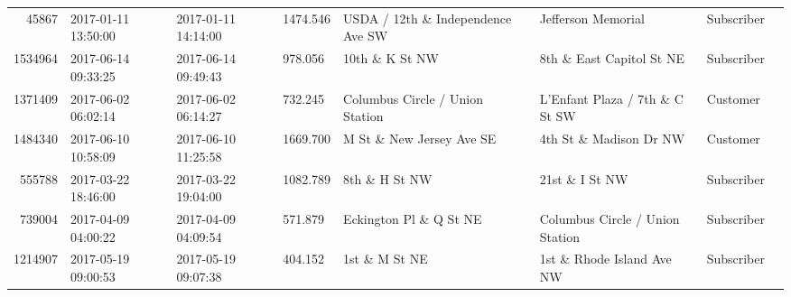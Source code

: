 \documentclass[11pt]{article}
\begin{document}
\begin{description}
\begin{tabular}{r|lllllll}
	   45867                                          & 2017-01-11 13:50:00                              & 2017-01-11 14:14:00                              & 1474.546                                         & USDA / 12th \& Independence Ave SW              & Jefferson Memorial                               & Subscriber                                      \\
	 1534964                                            & 2017-06-14 09:33:25                                & 2017-06-14 09:49:43                                &  978.056                                           & 10th \& K St NW                                   & 8th \& East Capitol St NE                         & Subscriber                                        \\
	 1371409                                            & 2017-06-02 06:02:14                                & 2017-06-02 06:14:27                                &  732.245                                           & Columbus Circle / Union Station                    & L'Enfant Plaza / 7th \& C St SW                   & Customer                                          \\
	 1484340                                            & 2017-06-10 10:58:09                                & 2017-06-10 11:25:58                                & 1669.700                                           & M St \& New Jersey Ave SE                         & 4th St \& Madison Dr NW                           & Customer                                          \\
	  555788                                            & 2017-03-22 18:46:00                                & 2017-03-22 19:04:00                                & 1082.789                                           & 8th \& H St NW                                    & 21st \& I St NW                                   & Subscriber                                        \\
	  739004                                          & 2017-04-09 04:00:22                              & 2017-04-09 04:09:54                              &  571.879                                         & Eckington Pl \& Q St NE                         & Columbus Circle / Union Station                  & Subscriber                                      \\
	 1214907                                            & 2017-05-19 09:00:53                                & 2017-05-19 09:07:38                                &  404.152                                           & 1st \& M St NE                                    & 1st \& Rhode Island Ave NW                        & Subscriber                                        \\

\end{tabular}
\end{description}
\end{document}
